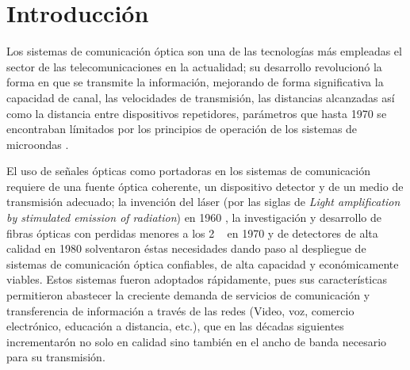 



\chapter{Introducción}

Los sistemas de comunicación óptica son una de las tecnologías más empleadas el sector de las telecomunicaciones en la actualidad; su desarrollo revolucionó la forma en que se transmite la información, mejorando de forma significativa la capacidad de canal, las velocidades de transmisión, las distancias alcanzadas así como la distancia entre dispositivos repetidores, parámetros que hasta 1970 se encontraban límitados por los principios de operación de los sistemas de microondas \citep{Agrawal2012}.

El uso de señales ópticas como portadoras en los sistemas de comunicación requiere de una fuente óptica coherente, un dispositivo detector y de un medio de transmisión adecuado; la invención del láser (por las siglas de \textit{Light amplification by stimulated  emission of radiation}) en 1960 \citep{Rawicz2008}, la investigación y desarrollo de fibras ópticas con perdidas menores a los 2 \si{\deci\belmilliwatt} en 1970 y de detectores de alta calidad en 1980 \citep{Tomasi2003} solventaron éstas necesidades dando paso al despliegue de sistemas de comunicación óptica confiables, de alta capacidad y económicamente viables. Estos sistemas fueron adoptados rápidamente, pues sus características permitieron abastecer la creciente demanda de servicios de comunicación y transferencia de información a través de las redes (Video, voz, comercio electrónico, educación a distancia, etc.), que en las décadas siguientes incrementarón no solo en calidad sino también en el ancho de banda necesario para su transmisión\citep{keiser3}.

